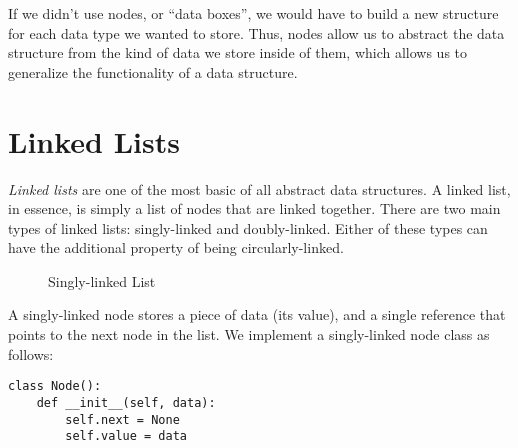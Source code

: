 If we didn't use nodes, or ``data boxes'', we would have to build a new structure for each data type we wanted to store.
Thus, nodes allow us to abstract the data structure from the kind of data we store inside of them, which allows us to generalize the functionality of a data structure.

\section*{Linked Lists}
\emph{Linked lists} are one of the most basic of all abstract data structures.
A linked list, in essence, is simply a list of nodes that are linked together.
There are two main types of linked lists: singly-linked and doubly-linked. Either of these types can have the additional property of being circularly-linked.

\begin{figure}
\centering
{}
\caption{Singly-linked List}
\end{figure}

A singly-linked node stores a piece of data (its value), and a single reference that points to the next node in the list.
We implement a singly-linked node class as follows:

\begin{lstlisting}
class Node():
    def __init__(self, data):
        self.next = None
        self.value = data
\end{lstlisting}

